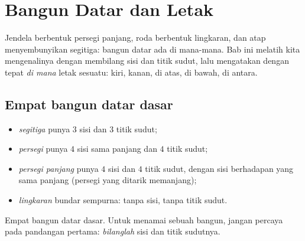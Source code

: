 \chapter{Bangun Datar dan Letak}\label{ch:g1:shapes}

Jendela berbentuk persegi panjang, roda berbentuk lingkaran, dan atap
menyembunyikan segitiga: bangun datar ada di mana-mana. Bab ini
melatih kita mengenalinya dengan membilang sisi dan titik sudut, lalu
mengatakan dengan tepat \emph{di mana} letak sesuatu: kiri, kanan, di
atas, di bawah, di antara.

\section{Empat bangun datar dasar}

\begin{definition}\label{def:g1:shapes:def}
\begin{itemize}
  \item \emph{segitiga} punya $3$ sisi dan $3$ titik sudut;
  \item \emph{persegi} punya $4$ sisi sama panjang dan $4$ titik sudut;
  \item \emph{persegi panjang} punya $4$ sisi dan $4$ titik
        sudut, dengan sisi berhadapan yang sama panjang (persegi yang
        ditarik memanjang);
  \item \emph{lingkaran} bundar sempurna: tanpa sisi, tanpa titik sudut.
\end{itemize}
\end{definition}

\begin{omfigure}

{\small Empat bangun datar dasar. Untuk menamai sebuah bangun, jangan
percaya pada pandangan pertama: \emph{bilanglah} sisi dan titik
sudutnya.}
\end{omfigure}

